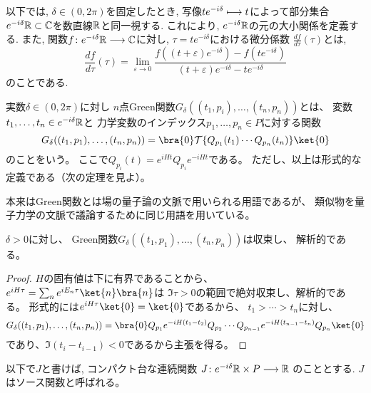 以下では, $\delta \in (0, 2\pi)$を固定したとき,
写像$te^{-i\delta} \longmapsto t$によって部分集合
$e^{-i\delta}\mathbb{R} \subset \mathbb{C}$を数直線$\mathbb{R}$と同一視する.
これにより, $e^{-i\delta}\mathbb{R}$の元の大小関係を定義する.
また, 関数$f \colon e^{-i\delta}\mathbb{R} \longrightarrow \mathbb{C}$に対し,
$\tau = te^{-i\delta}$における微分係数
$\frac{df}{d\tau}(\tau)$とは,
\begin{equation}
  \frac{df}{d\tau}(\tau) =
  \lim_{\varepsilon\to 0}
  \frac{f((t+\varepsilon)e^{-i\delta})-f(te^{-i\delta})}
       {(t+\varepsilon)e^{-i\delta}-te^{-i\delta}}
\end{equation}
のことである.

\begin{dfn}
  実数$\delta \in (0, 2\pi)$に対し
  $n$点Green関数$G_\delta((t_1,p_i),\ldots,(t_n,p_n))$とは、
  変数$t_1,\ldots,t_n\in e^{-i\delta}\mathbb{R}$と
  力学変数のインデックス$p_1,\ldots,p_n \in P$に対する関数
  \begin{equation}
    G_\delta((t_1,p_1),\ldots,(t_n,p_n))=
    \bra{0}\calT\{Q_{p_1}(t_1)\cdots Q_{p_n}(t_n)\}\ket{0}
  \end{equation}
  のことをいう。
  ここで$Q_{p_i}(t) = e^{iHt}Q_{p_i}e^{-iHt}$である。
  ただし、以上は形式的な定義である（次の定理を見よ）。
\end{dfn}

\begin{rem}
  本来はGreen関数とは場の量子論の文脈で用いられる用語であるが、
  類似物を量子力学の文脈で議論するために同じ用語を用いている。
\end{rem}

\begin{thm}
  $\delta>0$に対し、
  Green関数$G_\delta((t_1,p_1),\ldots,(t_n,p_n))$は収束し、
  解析的である。
\end{thm}

\begin{proof}
  $H$の固有値は下に有界であることから、
  $e^{iH\tau}=\sum_n e^{iE_n\tau}\ket{n}\bra{n}$は
  $\Im \tau > 0$の範囲で絶対収束し、解析的である。
  形式的には$e^{iH\tau}\ket{0}=\ket{0}$であるから、
  $t_1 > \cdots > t_n$に対し、
  \begin{equation}
    G_\delta((t_1,p_1),\ldots,(t_n,p_n)) =
    \bra{0}Q_{p_1}e^{-iH(t_1-t_2)}Q_{p_2}\cdots
    Q_{p_{n-1}}e^{-iH(t_{n-1}-t_n)}Q_{p_n}\ket{0}
  \end{equation}
  であり、$\Im(t_i-t_{i-1}) < 0$であるから主張を得る。
\end{proof}

以下で$J$と書けば, コンパクト台な連続関数
$J \colon e^{-i\delta}\mathbb{R} \times P \longrightarrow \mathbb{R}$
のこととする.
$J$はソース関数と呼ばれる。

